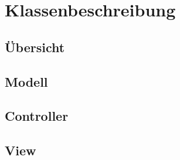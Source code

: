 \section{Klassenbeschreibung}
\subsection{Übersicht}
\subsection{Modell}
\subsection{Controller}
\subsection{View}